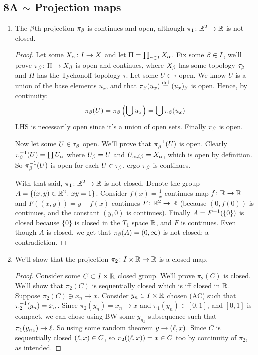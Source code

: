 \documentclass[a4paper]{article}
\newcommand\nsubsection[1]{\subsection*{#1}\addcontentsline{toc}{subsection}{#1}}
\begin{document}
	\section[Product Spaces and Weak Topologies]{}
	\nsubsection{8A $\sim$ Projection maps}
	\begin{enumerate}
		\item The $\beta$th projection $\pi_\beta$ is continues and open, although $\pi_1 \colon \mathbb{R}^{2} \to \mathbb{R}$ is not closed. \begin{proof}
			Let some $X_\alpha \colon I \to X$ and let $\Pi = \prod_{\alpha \in I} X_\alpha$. Fix some $\beta \in I$, we'll prove $\pi_\beta \colon \Pi \to X_\beta$ is open and continues, where $X_\beta$ has some topology $\tau_\beta$ and $\Pi$ has the Tychonoff topology $\tau$. Let some $U \in \tau$ open. We know $U$ is a union of the base elements $u_x$, and that $\pi_\beta(u_x) \overset{\mathrm{def}}{=} (u_x)_\beta$ is open. Hence, by continuity: 
			\[ \pi_\beta(U) = \pi_\beta\left ( \bigcup u_x \right ) = \bigcup \pi_\beta(u_x) \]
			LHS is necessarily open since it's a union of open sets. Finally $\pi_\beta$ is open. 
			
			Now let some $U \in \tau_\beta$ open. We'll prove that $\pi_\beta^{-1}(U)$ is open. Clearly $\pi_\beta^{-1}(U) = \prod U_\alpha$ where $U_\beta = U$ and $U_{\alpha \neq \beta} = X_\alpha$, which is open by definition. So $\pi_\beta^{-1}(U)$ is open for each $U \in \tau_\beta$, ergo $\pi_\beta$ is continues. 
			
			With that said, $\pi_1 \colon \mathbb{R}^{2} \to \mathbb{R}$ is not closed. Denote the group $A = \{(x, y) \in \mathbb{R}^{2}\colon xy = 1\}$. Consider $f(x) = \frac{1}{x}$ continues map $f \colon \mathbb{R} \to \mathbb{R}$ and $F((x, y)) = y - f(x)$ continues $F \colon \mathbb{R}^{2}\to \mathbb{R}$ (because $(0, f(0))$ is continues, and the constant $(y, 0)$ is continues). Finally $A = F^{-1}(\{0\})$ is closed because $\{0\}$ is closed in the $T_1$ space $\mathbb{R}$, and $F$ is continues. Even though $A$ is closed, we get that $\pi_\beta(A) = (0, \infty)$ is not closed; a contradiction. 
		\end{proof}
		\item We'll show that the projection $\pi_2 \colon I \times \mathbb{R} \to \mathbb{R}$ is a closed map. \begin{proof}
			Consider some $C \subset I \times \mathbb{R}$ closed group. We'll prove $\pi_2(C)$ is closed. We'll show that $\pi_2(C)$ is sequentially closed which is iff closed in $\mathbb{R}$. Suppose $\pi_2(C) \ni x_n \to x$. Consider $y_n \in I \times \mathbb{R}$ chosen (AC) such that $\pi_2^{-1}(y_n) = x_n$. Since $\pi_2(y_n) = x_n \to x$ and $\pi_1(y_n) \in [0, 1]$, and $[0, 1]$ is compact, we can chose using BW some $y_{n_k}$ subsequence such that $\pi_1(y_{n_k}) \to \ell$. So using some random theorem $y \to (\ell, x)$. Since $C$ is sequentially closed $(\ell, x) \in C$, so $\pi_2((\ell, x)) = x \in C$ too by continuity of $\pi_2$, as intended. 
		\end{proof}
	\end{enumerate}
	
\end{document}
